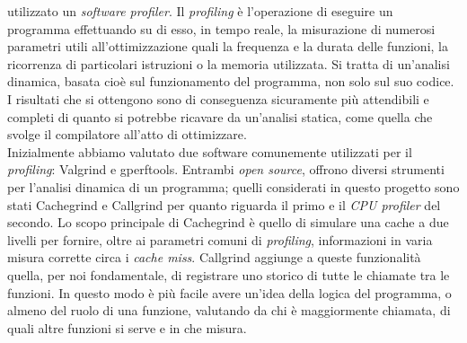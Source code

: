 utilizzato un \emph{software profiler}.
Il \emph{profiling} è l'operazione di eseguire un programma effettuando su di 
esso, in tempo reale, la misurazione di numerosi parametri utili 
all'ottimizzazione quali la frequenza e la durata delle  
funzioni, la ricorrenza di particolari istruzioni o la memoria utilizzata.
Si tratta di un'analisi dinamica, basata cioè sul funzionamento del programma, 
non solo sul suo codice. I risultati che si ottengono sono di conseguenza 
sicuramente più attendibili e completi di quanto si potrebbe ricavare da 
un'analisi statica, come quella che svolge il compilatore all'atto di 
ottimizzare.\\
Inizialmente abbiamo valutato due software comunemente utilizzati per 
il \emph{profiling}: Valgrind e gperftools.
Entrambi \emph{open source}, offrono diversi strumenti per l'analisi dinamica 
di un programma; quelli considerati in questo progetto sono stati Cachegrind e 
Callgrind per quanto riguarda il primo e il \emph{CPU profiler} del secondo. 
Lo scopo principale di Cachegrind è quello di simulare una cache a due livelli 
per fornire, oltre ai parametri comuni di \emph{profiling}, informazioni in 
varia misura corrette circa 
i \emph{cache miss}. Callgrind aggiunge a queste funzionalità quella, per noi 
fondamentale, di registrare uno storico di tutte le chiamate tra le funzioni. 
In questo modo è più facile avere un'idea della logica del programma, o almeno 
del ruolo di una funzione, valutando da chi è maggiormente chiamata, di quali 
altre funzioni si serve e in che misura.
